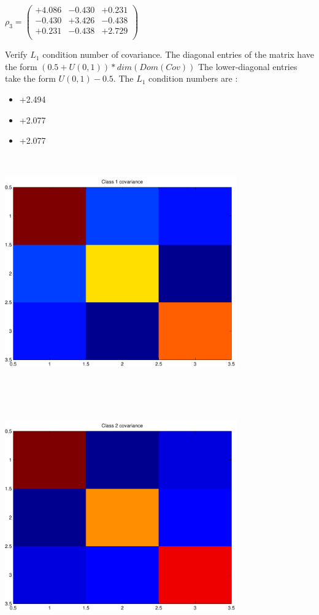 \documentclass[9pt]{article}
\theoremstyle{plain}
\theoremstyle{definition}
\theoremstyle{remark}
\numberwithin{equation}{section}
\begin{document}
$\rho_3 = \left(
\begin{array}{
ccc}
+4.086 & -0.430 & +0.231 \\
-0.430 & +3.426 & -0.438 \\
+0.231 & -0.438 & +2.729 \\
\end{array}
\right)$ \newline 

Verify $L_1$ condition number of covariance. The diagonal entries of the matrix have the form $(0.5 + U(0,1) )*dim(Dom(Cov))$
The lower-diagonal entries take the form $U(0,1) - 0.5$. 
The $L_1$ condition numbers are :
\begin{itemize}
\item +2.494
\item +2.077
\item +2.077
\end{itemize}
\includegraphics[width=10.0cm,height=10.0cm]{rv1_corr.pdf}

\includegraphics[width=10.0cm,height=10.0cm]{rv2_corr.pdf}
\end{document}
